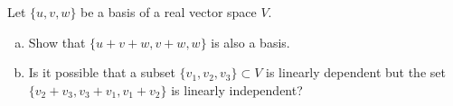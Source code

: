 \begin{exercise}
  \label{ex:hw03:modified-bases-and-dependence}
  Let \(\{u,v,w\}\) be a basis of a real vector space \(V\).
  \begin{enumerate}[(a)][2]
    \item Show that \(\{u+v+w,v+w,w\}\) is also a basis.
    \item Is it possible that a subset \(\{v_1,v_2,v_3\}\subset V\)
      is linearly dependent but the set
      \(\{v_2+v_3,v_3+v_1,v_1+v_2\}\) is linearly independent?
  \end{enumerate}
\end{exercise}
